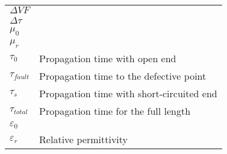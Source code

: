 \begin{table}[h]
\begin{tabular}{@{}ll@{}}
        \( \Delta VF \) & \\
        \( \Delta \tau \) & \\
        \( \mu_0 \) & \\
        \( \mu_r \) & \\
		\( \tau_0 \) & Propagation time with open end\\
		\( \tau_{fault} \) & Propagation time to the defective point\\
		\( \tau_s \) & Propagation time with short-circuited end\\
        \( \tau_{total} \) & Propagation time for the full length\\
        \( \varepsilon_0 \) & \\
		\( \varepsilon_r \) & Relative permittivity\\
    \end{tabular}
    \label{tab:glossar}
\end{table}